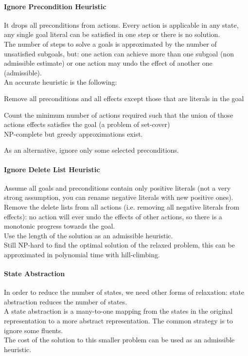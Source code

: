 \documentclass[10pt]{report}
\begin{document}
\paragraph{Ignore Precondition Heuristic} It drops all preconditions from actions. Every action is applicable in any state, any single goal literal can be satisfied in one step or there is no solution.\\
The number of steps to solve a goals is approximated by the number of unsatisfied subgoals, but: one action can achieve more than one subgoal (non admissible estimate) or one action may undo the effect of another one (admissible).\\
An accurate heuristic is the following:
\begin{list}{}{}
	\item Remove all preconditions and all effects except those that are literals in the goal
	\item Count the minimum number of actions required such that the union of those actions effects satisfies the goal (a problem of set-cover)\\
	NP-complete but greedy approximations exist.
\end{list}
As an alternative, ignore only some selected preconditions.
\paragraph{Ignore Delete List Heuristic} Assume all goals and preconditions contain only positive literals (not a very strong assumption, you can rename negative literals with new positive ones).\\
Remove the delete lists from all actions (i.e. removing all negative literals from effects): no action will ever undo the effects of other actions, so there is a monotonic progress towards the goal.\\
Use the length of the solution as an admissible heuristic.\\
Still NP-hard to find the optimal solution of the relaxed problem, this can be approximated in polynomial time with hill-climbing.
\paragraph{State Abstraction} In order to reduce the number of states, we need other forms of relaxation: state abstraction reduces the number of states.\\
A state abstraction is a many-to-one mapping from the states in the original representation to a more abstract representation. The common strategy is to ignore some fluents.\\
The cost of the solution to this smaller problem can be used as an admissible heuristic.
\end{document}
